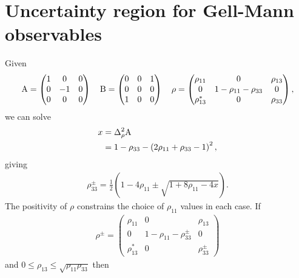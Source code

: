 \section{Uncertainty region for Gell-Mann observables}
\label{app:gellmann-ur}
Given
\begin{align}
  \operatorname{A} = \begin{pmatrix}
    1 & 0 & 0\\
    0 & -1 & 0\\
    0 & 0 & 0\\
  \end{pmatrix} \quad
  \operatorname{B} = \begin{pmatrix}
    0 & 0 & 1\\
    0 & 0 & 0\\
    1 & 0 & 0\\
  \end{pmatrix} \quad
  \rho =\begin{pmatrix}
    \rho_{11} & 0 & \rho_{13}\\
    0 & 1-\rho_{11} - \rho_{33} & 0\\
    \rho_{13}^* & 0 & \rho_{33}
  \end{pmatrix},
\end{align}
we can solve
\begin{align}
  x &= \varr{\opa}\\
    &= 1 - \rho_{33} - \left(2\rho_{11} + \rho_{33} - 1\right)^2,
\end{align}
giving
\begin{align}
  \rho_{33}^\pm = \frac{1}{2}\left(1-4\rho_{11} \pm\sqrt{1+8\rho_{11}-4x}\right).
\end{align}
The positivity of $\rho$ constrains the choice of $\rho_{11}$ values in each case. If
\begin{align}
  \rho^\pm = \begin{pmatrix}
    \rho_{11} & 0 & \rho_{13}\\
    0 & 1-\rho_{11} - \rho_{33}^\pm & 0\\
    \rho_{13}^* & 0 & \rho_{33}^\pm
  \end{pmatrix}
\end{align}
and $0\leq\rho_{13}\leq\sqrt{\rho_{11}\rho_{33}}$ then
